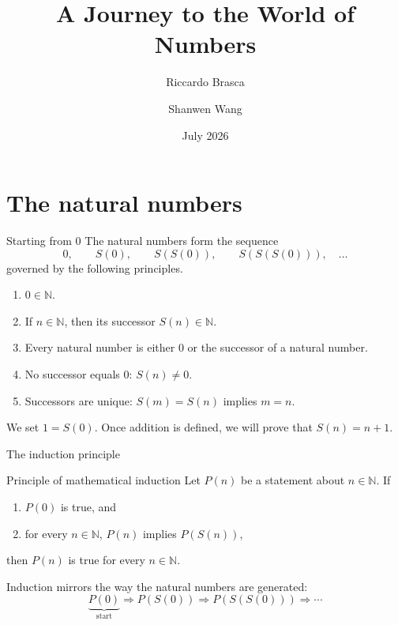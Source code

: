 \documentclass[aspectratio=169,11pt]{beamer}
\title{A Journey to the World of Numbers}
\author{Riccardo Brasca \and Shanwen Wang}
\institute{Renmin University}
\date{July 2026}
\newcommand{\N}{\mathbb N}
\newcommand{\suc}[1]{S(#1)}
\begin{document}
\begin{frame}[plain]
  \titlepage
\end{frame}

\begin{frame}
  \small
  \tableofcontents[hideallsubsections]
\end{frame}

\section{The natural numbers}

\begin{frame}{Starting from \(0\)}
  The natural numbers form the sequence
  \[
    0,\qquad \suc 0,\qquad \suc{\suc 0},\qquad
    \suc{\suc{\suc 0}},\quad\ldots
  \]
  governed by the following principles.

  \begin{enumerate}
    \item \(0\in\N\).
    \item If \(n\in\N\), then its \alert{successor} \(\suc n\in\N\).
    \item Every natural number is either \(0\) or the successor of a natural number.
    \item No successor equals \(0\): \(\suc n\ne0\).
    \item Successors are unique: \(\suc m=\suc n\) implies \(m=n\).
  \end{enumerate}

  We set \(1=\suc 0\).  Once addition is defined, we will prove that
  \(\suc n=n+1\).
\end{frame}

\begin{frame}{The induction principle}
  \begin{block}{Principle of mathematical induction}
    Let \(P(n)\) be a statement about \(n\in\N\).  If
    \begin{enumerate}
      \item \(P(0)\) is true, and
      \item for every \(n\in\N\), \(P(n)\) implies \(P(\suc n)\),
    \end{enumerate}
    then \(P(n)\) is true for every \(n\in\N\).
  \end{block}

  \vspace{0.4em}
  Induction mirrors the way the natural numbers are generated:
  \[
    \underbrace{P(0)}_{\text{start}}
    \Longrightarrow P(\suc 0)
    \Longrightarrow P(\suc{\suc 0})
    \Longrightarrow \cdots
  \]
\end{frame}
\end{document}
